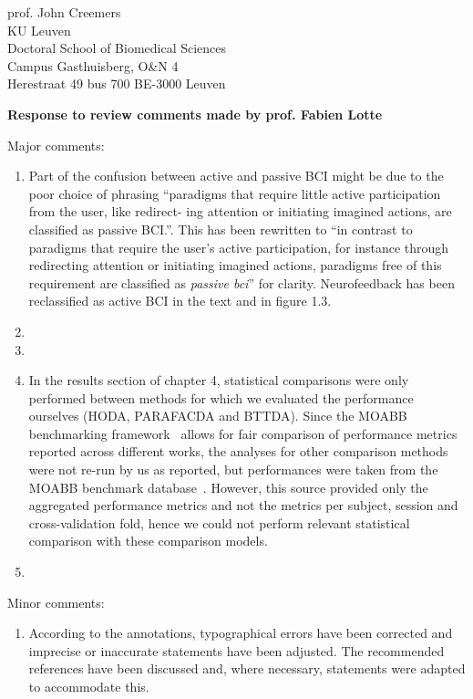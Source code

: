 \documentclass{letter}
\newcommand{\reply}[1]{%
	\textbf{Response to review comments made by prof. #1}

}
\begin{document}
\begin{letter}{
	prof. John Creemers \\
	KU Leuven \\
	Doctoral School of Biomedical Sciences \\
	Campus Gasthuisberg, O\&N 4 \\
	Herestraat 49 bus 700
	BE-3000 Leuven

}
\reply{Fabien Lotte}
Major comments:
\begin{enumerate}
	\item Part of the confusion between active and passive BCI might be due
	to the poor choice of phrasing ``paradigms that require little active participation from the user, like redirect-
	ing attention or initiating imagined actions, are classified as passive BCI.''.
	This has been rewritten to ``in contrast to paradigms that require the user's active participation, for
	instance through redirecting attention or initiating imagined actions,
	paradigms free of this requirement are classified as \emph{passive \ac{bci}}''
	for clarity.
	Neurofeedback has been reclassified as active BCI in the text and in
	figure 1.3.
	\item {}
	\item {}
	\item In the results section of chapter 4, statistical comparisons were
	only performed between methods for which we evaluated the performance
	ourselves (HODA, PARAFACDA and BTTDA).
	Since the MOABB benchmarking framework~\cite{Aristimunha2023} allows for
	fair comparison of performance metrics reported across different works,
	the analyses for other comparison methods were not re-run
	by us as reported, but performances were
	taken from the MOABB benchmark database~\cite{Chevallier2024}.
	However, this source provided only the aggregated performance metrics
	and not the metrics per subject, session and cross-validation fold,
	hence we could not perform relevant statistical comparison with these
	comparison models.
	\item {}
\end{enumerate}
Minor comments:
\begin{enumerate}
	\item According to the annotations, typographical errors have been
	corrected and imprecise or inaccurate statements have been adjusted.
	The recommended references have been discussed and, where necessary,
	statements were adapted to accommodate this.
\end{enumerate}


\end{letter}
\end{document}
